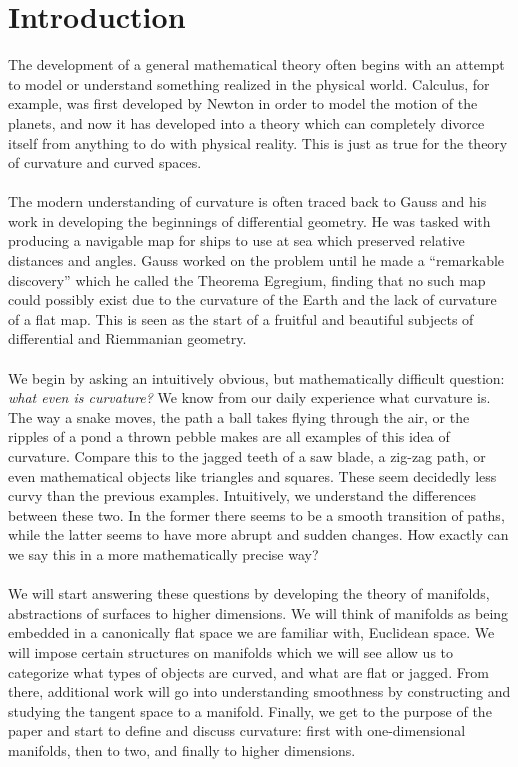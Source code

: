 \documentclass[]{article}
\newcommand\<{\ensuremath{\left\langle}}
\renewcommand\>{\ensuremath{\right\rangle}}
\newcommand{\RR}{\ensuremath{\mathbb{R}}}
\theoremstyle{definition}
\theoremstyle{definition}
\begin{document}
	\section*{Introduction}
	The development of a general mathematical theory often begins with an attempt to model or understand something realized in the physical world. Calculus, for example, was first developed by Newton in order to model the motion of the planets, and now it has developed into a theory which can completely divorce itself from anything to do with physical reality. This is just as true for the theory of curvature and curved spaces.\\
	\\
	The modern understanding of curvature is often traced back to Gauss and his work in developing the beginnings of differential geometry. He was tasked with producing a navigable map for ships to use at sea which preserved relative distances and angles. Gauss worked on the problem until he made a ``remarkable discovery'' which he called the Theorema Egregium, finding that no such map could possibly exist due to the curvature of the Earth and the lack of curvature of a flat map. This is seen as the start of a fruitful and beautiful subjects of differential and Riemmanian geometry.\\
	\\
	We begin by asking an intuitively obvious, but mathematically difficult question: \textit{what even is curvature?} We know from our daily experience what curvature is. The way a snake moves, the path a ball takes flying through the air, or the ripples of a pond a thrown pebble makes are all examples of this idea of curvature. Compare this to the jagged teeth of a saw blade, a zig-zag path, or even mathematical objects like triangles and squares. These seem decidedly less curvy than the previous examples. Intuitively, we understand the differences between these two. In the former there seems to be a smooth transition of paths, while the latter seems to have more abrupt and sudden changes. How exactly can we say this in a more mathematically precise way?\\
	\\
	We will start answering these questions by developing the theory of manifolds, abstractions of surfaces to higher dimensions. We will think of manifolds as being embedded in a canonically flat space we are familiar with, Euclidean space. We will impose certain structures on manifolds which we will see allow us to categorize what types of objects are curved, and what are flat or jagged. From there, additional work will go into understanding smoothness by constructing and studying the tangent space to a manifold. Finally, we get to the purpose of the paper and start to define and discuss curvature: first with one-dimensional manifolds, then to two, and finally to higher dimensions.\\
\end{document}
